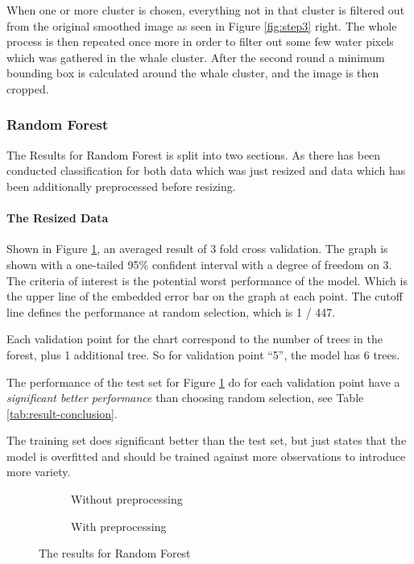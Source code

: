 When one or more cluster is chosen, everything not in that cluster is filtered out from the original smoothed image as seen in Figure \ref{fig:step3} right. The whole process is then repeated once more in order to filter out some few water pixels which was gathered in the whale cluster.
After the second round a minimum bounding box is calculated around the whale cluster, and the image is then cropped.



\subsubsection{Random Forest}
The Results for Random Forest is split into two sections. As there has been conducted classification for both data which was just resized and data which has been additionally preprocessed before resizing.

\paragraph{The Resized Data}
\label{par:rf-resized}
Shown in Figure \ref{fig:random-forest-resized}, an averaged result of 3 fold cross validation. The graph is shown with a one-tailed 95\% confident interval with a degree of freedom on 3. The criteria of interest is the potential worst performance of the model. Which is the upper line of the embedded error bar on the graph at each point. The cutoff line defines the performance at random selection, which is 1 / 447. 

Each validation point for the chart correspond to the number of trees in the forest, plus 1 additional tree. So for validation point ``5'', the model has 6 trees.

The performance of the test set for Figure \ref{fig:random-forest-resized} do for each validation point have a \emph{significant better performance} than choosing random selection, see Table \ref{tab:result-conclusion}.

The training set does significant better than the test set, but just states that the model is overfitted and should be trained against more observations to introduce more variety.

\begin{figure*}
  \centering
    \begin{subfigure}{.5\linewidth}
      \centering
      \caption{Without preprocessing}
      \label{fig:random-forest-resized}
    \end{subfigure}%
    \begin{subfigure}{.5\linewidth}
      \centering
      \caption{With preprocessing}
      \label{fig:random-forest-preprocessed}
    \end{subfigure}
  \caption{The results for Random Forest}
  \label{fig:random-forest}
\end{figure*}

